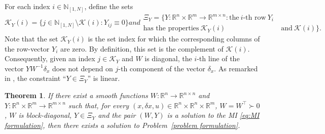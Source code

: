 \documentclass[10pt,twocolumn,twoside]{IEEEtran}
\theoremstyle{plain}
\newtheorem{theorem}{Theorem}
\theoremstyle{definition}
\theoremstyle{remark}
\begin{document}
For each index $i\in\mathbb{N}_{[1,N]}$, define the sets 
\begin{subequations}
	\begin{equation*}
		\mathscr{K}_Y(i)=\{j\in \mathbb{N}_{[1,N]}\setminus\mathscr{K}(i):Y_{ij}\equiv0\}
	\end{equation*}
	and
	\begin{align*}
		\Xi_Y=\{Y:\mathbb{R}^n\times\mathbb{R}^m\to\mathbb{R}^{m\times n}:\text{the}\ i\text{-th row}\ Y_i\ \\
		\text{has the properties}\ \mathscr{K}_Y(i)\ &\text{and}\ \mathscr{K}(i)\}.
	\end{align*}
\end{subequations}
Note that the set $\mathscr{K}_Y(i)$ is the set index for which the corresponding columns of the row-vector $Y_i$ are zero. By definition, this set is the complement of $\mathscr{K}(i)$. Consequently, given an index $j\in\mathscr{K}_Y$ and $W$ is diagonal, the $i$-th line of the vector $YW^{-1}\delta_x$ does not depend on $j$-th component of the vector $\delta_x$. As remarked in \cite{Tanaka2011}, the constraint ``$Y\in\Xi_Y$'' is linear.

\begin{theorem}\label{thm:main result}
	If there exist a smooth functions $W:\mathbb{R}^n\to\mathbb{R}^{n\times n}$ and $Y:\mathbb{R}^n\times\mathbb{R}^m\to\mathbb{R}^{m\times n}$ such that, for every $(x,\delta x,u)\in\mathbb{R}^n\times\mathbb{R}^n\times\mathbb{R}^m$, $W=W^\top\succ0$, $W$ is block-diagonal, $Y\in\Xi_Y$ and the pair $(W,Y)$ is a solution to the MI \eqref{eq:MI formulation}, then there exists a solution to Problem~\ref{problem formulation}.
\end{theorem}
\end{document}
